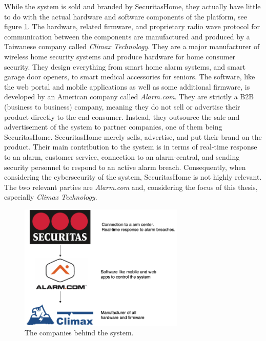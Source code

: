 While the system is sold and branded by SecuritasHome, they actually have little to do with the actual hardware and software components of the platform, see figure \ref{fig:company-structure}. The hardware, related firmware, and proprietary radio wave protocol for communication between the components are manufactured and produced by a Taiwanese company called \textit{Climax Technology}. They are a major manufacturer of wireless home security systems and produce hardware for home consumer security. They design everything from smart home alarm systems, and smart garage door openers, to smart medical accessories for seniors. The software, like the web portal and mobile applications as well as some additional firmware, is developed by an American company called \textit{Alarm.com}. They are strictly a B2B (business to business) company, meaning they do not sell or advertise their product directly to the end consumer. Instead, they outsource the sale and advertisement of the system to partner companies, one of them being SecuritasHome. SecuritasHome merely sells, advertise, and put their brand on the product. Their main contribution to the system is in terms of real-time response to an alarm, customer service, connection to an alarm-central, and sending security personnel to respond to an active alarm breach. Consequently, when considering the cybersecurity of the system, SecuritasHome is not highly relevant. The two relevant parties are \textit{Alarm.com} and, considering the focus of this thesis, especially \textit{Climax Technology}.
\begin{figure}[!ht]
    \centering
    \includegraphics[width=0.7\textwidth]{images/3-system/company-structure.png}
    \caption{The companies behind the system.}
    \label{fig:company-structure}
\end{figure}

